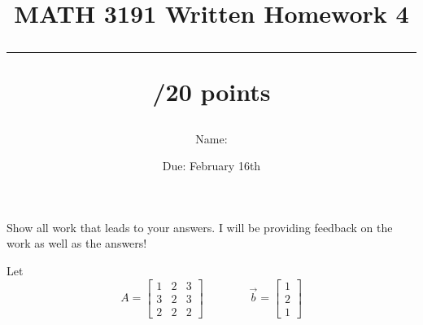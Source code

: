 \documentclass{exam}
\title{MATH 3191 Written Homework 4\\\rule{30pt}{1pt}/20 points}
\author{Name: \rule{150pt}{1pt}}
\date{Due: February 16th}
\begin{document}
\maketitle
Show all work that leads to your answers. I will be providing feedback on the work as well as the answers!
\begin{questions}
    \question[20] Let 
    \[
        A = \begin{bmatrix}
            1 & 2 & 3\\
            3 & 2 & 3\\
            2 & 2 & 2
            \end{bmatrix}\qquad\qquad \vec{b} = \begin{bmatrix}
            1\\2\\1
            \end{bmatrix}
    \]
\end{questions}
\end{document}
